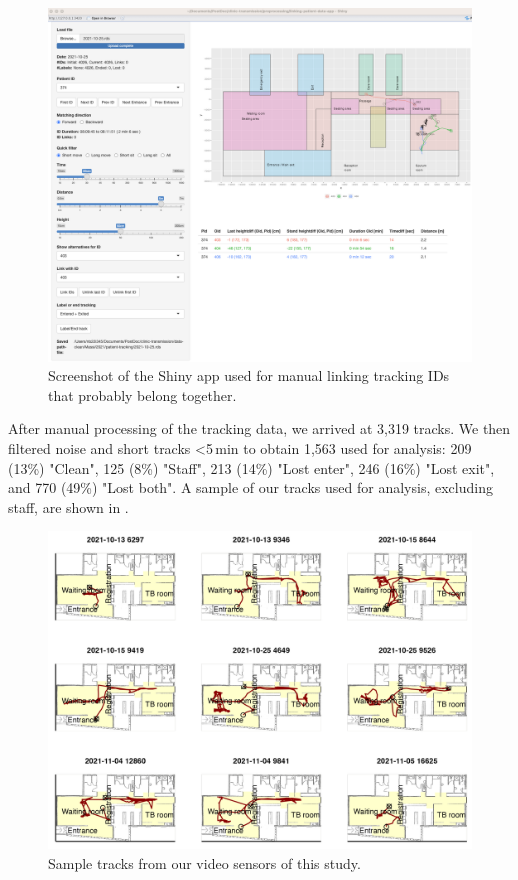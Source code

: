 \documentclass[fleqn,11pt]{wlscirep_supp}
\begin{document}
\begin{figure}[!htpb]
    \centering
    \includegraphics[width=\linewidth]{doc/paper/shiny-tool-screenshot.png}
    \caption{Screenshot of the Shiny app used for manual linking tracking IDs that probably belong together.}
    \label{fig:shiny-app}
\end{figure}

After manual processing of the tracking data, we arrived at 3,319 tracks. We then filtered noise and short tracks <5\,min to obtain 1,563 used for analysis: 209 (13\%) "Clean", 125 (8\%) "Staff", 213 (14\%) "Lost enter", 246 (16\%) "Lost exit", and 770 (49\%) "Lost both". A sample of our tracks used for analysis, excluding staff, are shown in .

\begin{figure}[!htpb]
    \centering
    \includegraphics{results/data/example-patient-tracks.png}
    \caption{Sample tracks from our video sensors of this study.}
    \label{fig:tracking-examples}
\end{figure}
\end{document}
